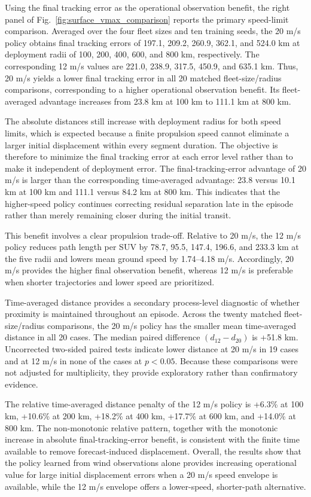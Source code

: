 \documentclass[a4paper,fleqn]{cas-dc}
\begin{document}
Using the final tracking error as the operational observation benefit, the right
panel of Fig.~\ref{fig:surface_vmax_comparison} reports the primary
speed-limit comparison. Averaged over the four fleet sizes and ten training
seeds, the 20 m/s policy obtains final tracking errors of 197.1, 209.2, 260.9,
362.1, and 524.0 km at deployment radii of 100, 200, 400, 600, and 800 km,
respectively. The corresponding 12 m/s values are 221.0, 238.9, 317.5, 450.9,
and 635.1 km. Thus, 20 m/s yields a lower final tracking error in all 20
matched fleet-size/radius comparisons, corresponding to a higher operational
observation benefit. Its fleet-averaged advantage increases from 23.8 km at
100 km to 111.1 km at 800 km.

The absolute distances still increase with deployment radius for both speed
limits, which is expected because a finite propulsion speed cannot eliminate a
larger initial displacement within every segment duration. The objective is
therefore to minimize the final tracking error at each error level rather than to
make it independent of deployment error. The final-tracking-error advantage of
20 m/s is larger than the corresponding time-averaged advantage: 23.8 versus
10.1 km at 100 km and 111.1 versus 84.2 km at 800 km. This indicates that the
higher-speed policy continues correcting residual separation late in the
episode rather than merely remaining closer during the initial transit.

This benefit involves a clear propulsion trade-off. Relative to 20 m/s, the
12 m/s policy reduces path length per SUV by 78.7, 95.5, 147.4, 196.6, and
233.3 km at the five radii and lowers mean ground speed by 1.74--4.18 m/s.
Accordingly, 20 m/s provides the higher final observation benefit, whereas
12 m/s is preferable when shorter trajectories and lower speed are prioritized.

Time-averaged distance provides a secondary process-level diagnostic of
whether proximity is maintained throughout an episode. Across the twenty
matched fleet-size/radius comparisons, the 20 m/s policy has the smaller mean
time-averaged distance in all 20 cases. The median paired difference
$(d_{12}-d_{20})$ is +51.8 km. Uncorrected two-sided paired tests indicate
lower distance at 20 m/s in 19 cases and at 12 m/s in none of the cases at
$p<0.05$. Because these comparisons were not adjusted for multiplicity, they
provide exploratory rather than confirmatory evidence.

The relative time-averaged distance penalty of the 12 m/s policy is
+6.3\% at 100 km, +10.6\% at 200 km, +18.2\% at 400 km, +17.7\% at 600 km,
and +14.0\% at 800 km. The non-monotonic relative pattern, together with the
monotonic increase in absolute final-tracking-error benefit, is consistent with the
finite time available to remove forecast-induced displacement. Overall, the
results show that the policy learned from wind observations alone provides
increasing operational value for large initial displacement errors when a
20 m/s speed envelope is available, while the 12 m/s envelope offers a
lower-speed, shorter-path alternative.
\end{document}
